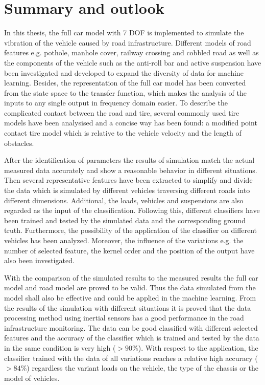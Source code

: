 \chapter{Summary and outlook}

In this thesis, the full car model with 7 \ac{DOF} is implemented to simulate the vibration of the vehicle caused by road infrastructure.
%
Different models of road features e.g. pothole, manhole cover, railway crossing and cobbled road as well as the components of the vehicle such as the anti-roll bar and active suspension have been investigated and developed to expand the diversity of data for machine learning.
%
Besides, the representation of the full car model has been converted from the state space to the transfer function, which makes the analysis of the inputs to any single output in frequency domain easier.
%
To describe the complicated contact between the road and tire, several commonly used tire models have been analysised and a concise way has been found: a modified point contact tire model which is relative to the vehicle velocity and the length of obstacles.

After the identification of parameters the results of simulation match the actual measured data accurately and show a reasonable behavior in different situations.
%
Then several representative features have been extracted to simplify and divide the data which is simulated by different vehicles traversing different roads into different dimensions.
%
Additional, the loads, vehicles and suspensions are also regarded as the input of the classification.
%
Following this, different classifiers have been trained and tested by the simulated data and the corresponding ground truth.
%
Furthermore, the possibility of the application of the classifier on different vehicles has been analyzed.
%
Moreover, the influence of the variations e.g. the number of selected feature, the kernel order and the position of the output have also been investigated.

With the comparison of the simulated results to the measured results the full car model and road model are proved to be valid.
%
Thus the data simulated from the model shall also be effective and could be applied in the machine learning.
%
From the results of the simulation with different situations it is proved that the data processing method using inertial sensors has a good performance in the road infrastructure monitoring. 
%
The data can be good classified with different selected features and the accuracy of the classifier which is trained and tested by the data in the same condition is very high ($>90\%$). 
%
With respect to the application, the classifier trained with the data of all variations reaches a relative high accuracy ($>84\%$) regardless the variant loads on the vehicle, the type of the chassis or the model of vehicles.

